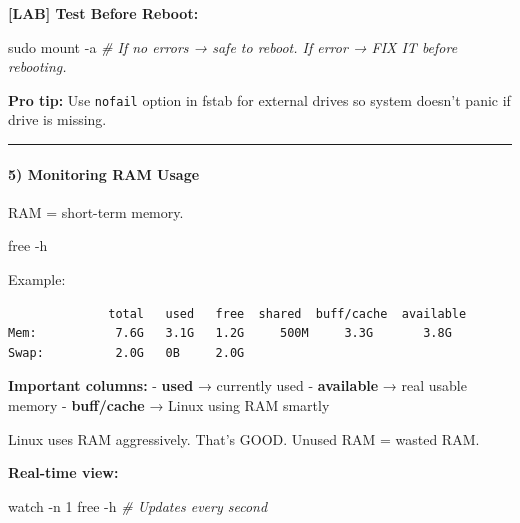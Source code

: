 \documentclass[
  english,
  paper=a4,
  oneside  ,captions=tableheading
]{scrartcl}
\newenvironment{Shaded}{}{}
\newcommand{\AttributeTok}[1]{\textcolor[rgb]{0.49,0.56,0.16}{#1}}
\newcommand{\CommentTok}[1]{\textcolor[rgb]{0.38,0.63,0.69}{\textit{#1}}}
\newcommand{\ExtensionTok}[1]{#1}
\newcommand{\FunctionTok}[1]{\textcolor[rgb]{0.02,0.16,0.49}{#1}}
\newcommand{\NormalTok}[1]{#1}
\renewenvironment{quote}{\begin{customblockquote}\list{}{\rightmargin=0em\leftmargin=0em}%
\item\relax\color{blockquote-text}\ignorespaces}{\unskip\unskip\endlist\end{customblockquote}}
\begin{document}
\textbf{{[}LAB{]} Test Before Reboot:}

\begin{Shaded}
\begin{Highlighting}[]
\FunctionTok{sudo}\NormalTok{ mount }\AttributeTok{{-}a}    \CommentTok{\# If no errors → safe to reboot. If error → FIX IT before rebooting.}
\end{Highlighting}
\end{Shaded}

\begin{quote}
\textbf{Pro tip:} Use \texttt{nofail} option in fstab for external
drives so system doesn't panic if drive is missing.
\end{quote}

\begin{center}\rule{0.5\linewidth}{0.5pt}\end{center}

\paragraph{5) Monitoring RAM Usage}\label{monitoring-ram-usage}

RAM = short-term memory.

\begin{Shaded}
\begin{Highlighting}[]
\FunctionTok{free} \AttributeTok{{-}h}
\end{Highlighting}
\end{Shaded}

Example:

\begin{verbatim}
              total   used   free  shared  buff/cache  available
Mem:           7.6G   3.1G   1.2G     500M     3.3G       3.8G
Swap:          2.0G   0B     2.0G
\end{verbatim}

\textbf{Important columns:} - \textbf{used} → currently used -
\textbf{available} → real usable memory - \textbf{buff/cache} → Linux
using RAM smartly

\faExclamationCircle Linux uses RAM aggressively. That's GOOD. Unused
RAM = wasted RAM.

\textbf{Real-time view:}

\begin{Shaded}
\begin{Highlighting}[]
\ExtensionTok{watch} \AttributeTok{{-}n}\NormalTok{ 1 free }\AttributeTok{{-}h}    \CommentTok{\# Updates every second}
\end{Highlighting}
\end{Shaded}
\end{document}
